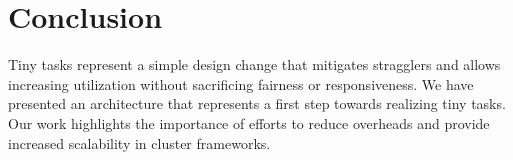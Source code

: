 \section{Conclusion}
Tiny tasks represent a simple design change that mitigates stragglers and
allows increasing utilization without sacrificing fairness or responsiveness.
We have presented an architecture that represents a first
step towards realizing tiny tasks.
Our work highlights the importance of efforts to reduce overheads and provide
increased scalability in cluster frameworks.
